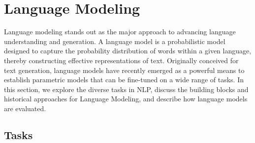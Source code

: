 



\section{Language Modeling}

Language modeling stands out as the major approach to advancing language understanding and generation. A language model is a probabilistic model designed to capture the probability distribution of words within a given language, thereby constructing effective representations of text. Originally conceived for text generation, language models have recently emerged as a powerful means to establish parametric models that can be fine-tuned on a wide range of tasks. 
In this section, we explore the diverse tasks in \ac{NLP}, discuss the building blocks and historical approaches for Language Modeling, and describe how language models are evaluated.

\subsection{Tasks} 

